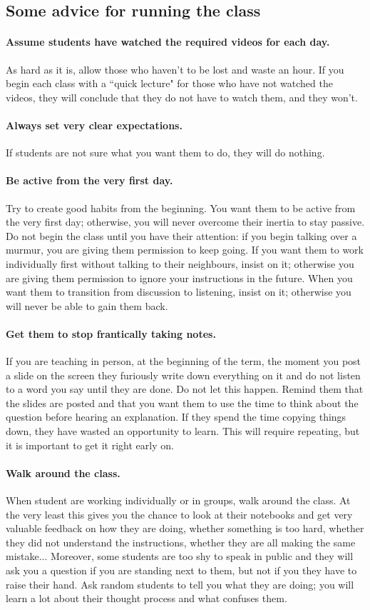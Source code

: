 \documentclass[11pt]{article}
\begin{document}
	\subsection{Some advice for running the class}
	\label{sec:advice}
	\paragraph{Assume students have watched the required videos for each day.}
	As hard as it is, allow those who haven't to be lost and waste an hour. If you
	begin each class with a ``quick lecture" for those who have not watched the
	videos, they will conclude that they do not have to watch them, and they won't.
	\paragraph{Always set very clear expectations.}
	If students are not sure what you want them to do, they will do nothing.
	\paragraph{Be active from the very first day.}
	Try to create good habits from the beginning. You want them to be active from
	the very first day; otherwise, you will never overcome their inertia to stay
	passive. Do not begin the class until you have their attention: if you begin
	talking over a murmur, you are giving them permission to keep going. If you
	want them to work individually first without talking to their neighbours, insist
	on it; otherwise you are giving them permission to ignore your instructions in
	the future. When you want them to transition from discussion to listening,
	insist on it; otherwise you will never be able to gain them back.
	\paragraph{Get them to stop frantically taking notes.}
	If you are teaching in person, at the beginning of the term, the moment you post
	a slide on the screen they furiously write down everything on it and do not listen
	to a word you say until they are done. Do not let this happen. Remind them that
	the slides are posted and that you want them to use the time to think about the
	question before hearing an explanation. If they spend the time copying things
	down, they have wasted an opportunity to learn. This will require repeating, but
	it is important to get it right early on.
	\paragraph{Walk around the class.}
	When student are working individually or in groups, walk around the class. At the
	very least this gives you the chance to look at their notebooks and get very valuable
	feedback on how they are doing, whether something is too hard, whether they did
	not understand the instructions, whether they are all making the same mistake...
	Moreover, some students are too shy to speak in public and they will ask you a
	question if you are standing next to them, but not if you they have to raise their
	hand. Ask random students to tell you what they are doing; you will learn a lot
	about their thought process and what confuses them.
\end{document}
